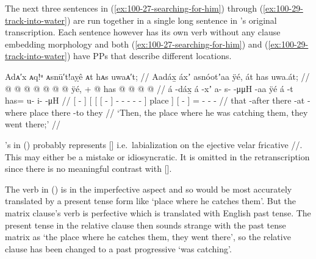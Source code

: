 The next three sentences in (\ref{ex:100-27-searching-for-him}) through (\ref{ex:100-29-track-into-water}) are run together in a single long sentence in \citeauthor{swanton:1909}’s original transcription.
Each sentence however has its own verb without any clause embedding morphology and both (\ref{ex:100-27-searching-for-him}) and (\ref{ex:100-29-track-into-water}) have PPs that describe different locations. 

\ex\label{ex:100-27-searching-for-him}%
%
\begingl
	\glpreamble	Adᴀ′x ᴀq!ᵘ ᴀsnū′t!aỵê ᴀt hᴀs uwaᴀ′t; //
	\glpreamble	Aadáx̱ áxʼ asnóotʼaa ÿé, át has uwa.át; //
	\gla	{}  @ {} {} 
		{} {} {}  @ {} {}
			 @ {} @ {} @ {} @ {} @ {} {} ÿé, {} +
		{}  @ {} {} has @  @ {} @ {} @ {} //
	\glb	{} á -dáx̱ {}
		{} {} {} á -xʼ {}
			a- s-  -μμH -aa {} {} ÿé {} 
		{} á -t {} has= u- i-  -μH //
	\glc	{}[  - {}]
		{}[ {}[ {}[  - {}]
			- -  - - - {}] place {}]
		{}[  - {}]
		= - -  - //
	\gld	{} that -after {} 
		{} {} {} there -at {} 
			 {} {} {} {} -where {} place {}
		{} there -to {} they  {} {} {} //
	\glft	‘Then, the place where he was catching them, they went there;’
		//
\endgl
\xe

\citeauthor{swanton:1909}’s  in (\lastx) probably represents [] i.e.\ labialization on the ejective velar fricative //.
This may either be a mistake or idiosyncratic.
It is omitted in the retranscription since there is no meaningful contrast with [].

The verb  in (\lastx) is in the imperfective aspect and so would be most accurately translated by a present tense form like ‘place where he catches them’.
But the matrix clause’s verb is perfective which is translated with English past tense.
The present tense in the relative clause then sounds strange with the past tense matrix as ‘the place where he catches them, they went there’, so the relative clause has been changed to a past progressive ‘was catching’.

